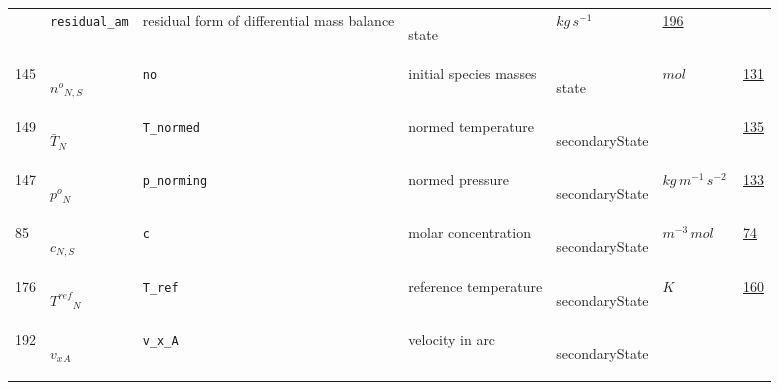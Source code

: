 \begin{longtable}{|p{1cm}|p{2.5cm}|p{4.5cm}|p{8cm}|p{3.0cm}|p{3cm}|p{1cm}|}
             & \verb|residual_am|
             & residual form of differential mass balance
             & \begin{lay}state \end{lay}
             & $ kg \,s^{-1} \, $
             &                 \hyperlink{"e:196"}{ 196 }
                 \\
            145
             & \hypertarget{"v:145"}{ $ {{n^o}}{_{N, S}} $}
             & \verb|no|
             & initial species masses
             & \begin{lay}state \end{lay}
             & $ mol \, $
             &                 \hyperlink{"e:131"}{ 131 }
                 \\
            149
             & \hypertarget{"v:149"}{ $ {{\bar{T}}}{_{N}} $}
             & \verb|T_normed|
             & normed temperature
             & \begin{lay}secondaryState \end{lay}
             & $  $
             &                 \hyperlink{"e:135"}{ 135 }
                 \\
            147
             & \hypertarget{"v:147"}{ $ {{p^o}}{_{N}} $}
             & \verb|p_norming|
             & normed pressure
             & \begin{lay}secondaryState \end{lay}
             & $ kg \,m^{-1} \,s^{-2} \, $
             &                 \hyperlink{"e:133"}{ 133 }
                 \\
            85
             & \hypertarget{"v:85"}{ $ {c}{_{N, S}} $}
             & \verb|c|
             & molar concentration
             & \begin{lay}secondaryState \end{lay}
             & $ m^{-3} \,mol \, $
             &                 \hyperlink{"e:74"}{ 74 }
                 \\
            176
             & \hypertarget{"v:176"}{ $ {{T^{ref}}}{_{N}} $}
             & \verb|T_ref|
             & reference temperature
             & \begin{lay}secondaryState \end{lay}
             & $ K \, $
             &                 \hyperlink{"e:160"}{ 160 }
                 \\
            192
             & \hypertarget{"v:192"}{ $ {{v_x}}{_{A}} $}
             & \verb|v_x_A|
             & velocity in arc
             & \begin{lay}secondaryState \end{lay}

\end{longtable}
